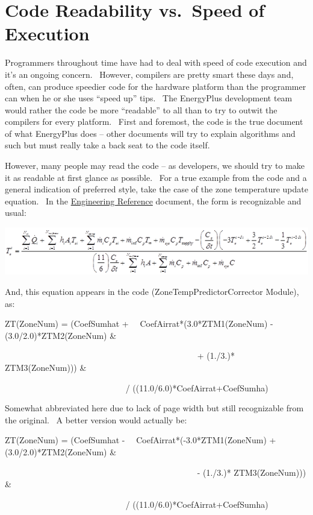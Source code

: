 \section{Code Readability vs.~Speed of Execution}\label{code-readability-vs.speed-of-execution}

Programmers throughout time have had to deal with speed of code execution and it's an ongoing concern.~ However, compilers are pretty smart these days and, often, can produce speedier code for the hardware platform than the programmer can when he or she uses ``speed up'' tips.~ The EnergyPlus development team would rather the code be more ``readable'' to all than to try to outwit the compilers for every platform.~ First and foremost, the code is the true document of what EnergyPlus does -- other documents will try to explain algorithms and such but must really take a back seat to the code itself.

However, many people may read the code -- as developers, we should try to make it as readable at first glance as possible.~ For a true example from the code and a general indication of preferred style, take the case of the zone temperature update equation.~ In the \href{file:///E:/Docs4PDFs/EngineeringReference.pdf}{Engineering Reference} document, the form is recognizable and usual:

\includegraphics{media/image001.png}

And, this equation appears in the code (ZoneTempPredictorCorrector Module), as:

ZT(ZoneNum) = (CoefSumhat +~~ CoefAirrat*(3.0*ZTM1(ZoneNum) - (3.0/2.0)*ZTM2(ZoneNum) \&

~~~~~~~~~~~~~~~~~~~~~~~~~~~~~~~~~~~~~~~~~~~~~ + (1./3.)* ZTM3(ZoneNum))) \&

~~~~~~~~~~~~~~~~~~~~~~~~~~~~ / ((11.0/6.0)*CoefAirrat+CoefSumha)

Somewhat abbreviated here due to lack of page width but still recognizable from the original.~ A better version would actually be:

ZT(ZoneNum) = (CoefSumhat -~~ CoefAirrat*(-3.0*ZTM1(ZoneNum) + (3.0/2.0)*ZTM2(ZoneNum) \&

~~~~~~~~~~~~~~~~~~~~~~~~~~~~~~~~~~~~~~~~~~~~~ - (1./3.)* ZTM3(ZoneNum))) \&

~~~~~~~~~~~~~~~~~~~~~~~~~~~~ / ((11.0/6.0)*CoefAirrat+CoefSumha)

